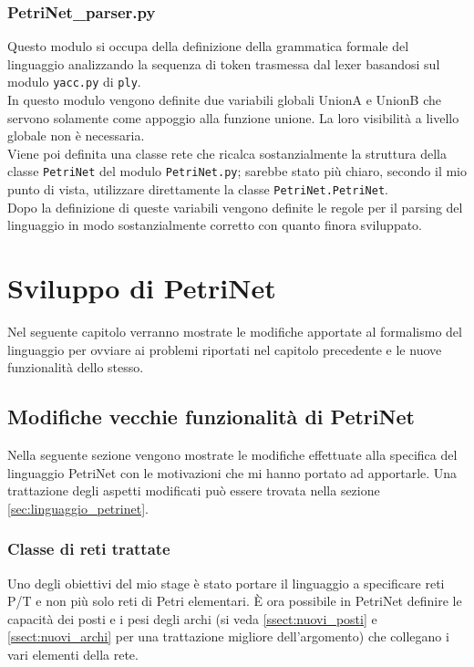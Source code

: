 \documentclass[italian,12pt]{book}
\begin{document}
\subsection{PetriNet\_parser.py}
Questo modulo si occupa della definizione della grammatica formale del linguaggio analizzando la 
sequenza di token trasmessa dal lexer basandosi sul modulo {\tt yacc.py} di {\tt ply}.\\
In questo modulo vengono definite due variabili globali UnionA e UnionB che servono solamente come
appoggio alla funzione unione. La loro visibilità a livello globale non è necessaria.\\
Viene poi definita una classe rete che ricalca sostanzialmente la struttura della classe 
{\tt PetriNet} del modulo {\tt PetriNet.py}; sarebbe stato più chiaro, secondo il mio
punto di vista, utilizzare direttamente la classe {\tt PetriNet.PetriNet}.\\
Dopo la definizione di queste variabili vengono definite le regole per il parsing del linguaggio 
in modo sostanzialmente corretto con quanto finora sviluppato.


\chapter{Sviluppo di PetriNet}\label{cha:sviluppo_petrinet}
Nel seguente capitolo verranno mostrate le modifiche apportate al formalismo del linguaggio per ovviare 
ai problemi riportati nel capitolo precedente e le nuove funzionalità dello stesso.

\section{Modifiche vecchie funzionalità di PetriNet}
Nella seguente sezione vengono mostrate le modifiche effettuate alla specifica del linguaggio 
PetriNet con le motivazioni che mi hanno portato ad apportarle. Una trattazione degli aspetti 
modificati può essere trovata nella sezione \ref{sec:linguaggio_petrinet}.

\subsection{Classe di reti trattate}\label{ssect:classe_di_reti_trattate_new}
Uno degli obiettivi del mio stage è stato portare il linguaggio a specificare reti P/T e non più 
solo reti di Petri elementari. È ora possibile in PetriNet definire le capacità dei posti 
e i pesi degli archi (si veda \ref{ssect:nuovi_posti} e \ref{ssect:nuovi_archi} per una 
trattazione migliore dell'argomento) che collegano i vari elementi della rete.
\end{document}
